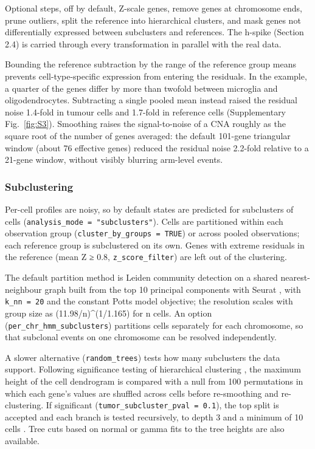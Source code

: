 Optional steps, off by default, Z-scale genes, remove genes at chromosome ends, prune outliers, split the reference into hierarchical clusters, and mask genes not differentially expressed between subclusters and references. The h-spike (Section 2.4) is carried through every transformation in parallel with the real data.

Bounding the reference subtraction by the range of the reference group means prevents cell-type-specific expression from entering the residuals. In the example, a quarter of the genes differ by more than twofold between microglia and oligodendrocytes. Subtracting a single pooled mean instead raised the residual noise 1.4-fold in tumour cells and 1.7-fold in reference cells (Supplementary Fig.~\ref{fig:S3}). Smoothing raises the signal-to-noise of a CNA roughly as the square root of the number of genes averaged: the default 101-gene triangular window (about 76 effective genes) reduced the residual noise 2.2-fold relative to a 21-gene window, without visibly blurring arm-level events.

\subsubsection{Subclustering}

Per-cell profiles are noisy, so by default states are predicted for subclusters of cells (\texttt{analysis\_mode\ =\ "subclusters"}). Cells are partitioned within each observation group (\texttt{cluster\_by\_groups\ =\ TRUE}) or across pooled observations; each reference group is subclustered on its own. Genes with extreme residuals in the reference (mean \textbar Z\textbar{} ≥ 0.8, \texttt{z\_score\_filter}) are left out of the clustering.

The default partition method is Leiden community detection \citep{traag2019leiden} on a shared nearest-neighbour graph built from the top 10 principal components with Seurat \citep{hao2024seurat}, with \texttt{k\_nn\ =\ 20} and the constant Potts model objective; the resolution scales with group size as (11.98/n)\^{}(1/1.165) for n cells. An option (\texttt{per\_chr\_hmm\_subclusters}) partitions cells separately for each chromosome, so that subclonal events on one chromosome can be resolved independently.

A slower alternative (\texttt{random\_trees}) tests how many subclusters the data support. Following significance testing of hierarchical clustering \citep{kimes2017shc}, the maximum height of the cell dendrogram is compared with a null from 100 permutations in which each gene's values are shuffled across cells before re-smoothing and re-clustering. If significant (\texttt{tumor\_subcluster\_pval\ =\ 0.1}), the top split is accepted and each branch is tested recursively, to depth 3 and a minimum of 10 cells \citep{haas2021thesis}. Tree cuts based on normal or gamma fits to the tree heights are also available.

